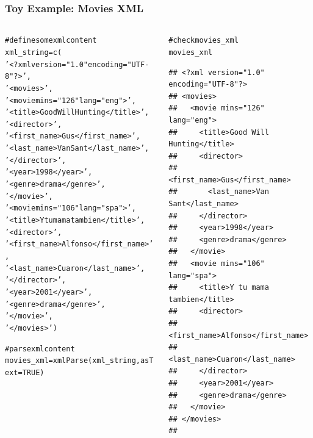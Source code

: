 \documentclass{beamer}\usepackage[]{graphicx}\usepackage[]{color}
\makeatletter
\newcommand{\hlnum}[1]{\textcolor[rgb]{0.063,0.58,0.627}{#1}}%
\newcommand{\hlstr}[1]{\textcolor[rgb]{0.063,0.58,0.627}{#1}}%
\newcommand{\hlcom}[1]{\textcolor[rgb]{0.588,0.588,0.588}{#1}}%
\newcommand{\hlstd}[1]{\textcolor[rgb]{0.196,0.196,0.196}{#1}}%
\newcommand{\hlkwb}[1]{\textcolor[rgb]{0.627,0,0.314}{#1}}%
\newcommand{\hlkwc}[1]{\textcolor[rgb]{0,0.631,0.314}{#1}}%
\newcommand{\hlkwd}[1]{\textcolor[rgb]{0.78,0.227,0.412}{#1}}%
\newenvironment{kframe}{%
 \def\at@end@of@kframe{}%
 \ifinner\ifhmode%
  \def\at@end@of@kframe{\end{minipage}}%
  \begin{minipage}{\columnwidth}%
 \fi\fi%
 \def\FrameCommand##1{\hskip\@totalleftmargin \hskip-\fboxsep
 \colorbox{shadecolor}{##1}\hskip-\fboxsep
     \hskip-\linewidth \hskip-\@totalleftmargin \hskip\columnwidth}%
 \MakeFramed {\advance\hsize-\width
   \@totalleftmargin\z@ \linewidth\hsize
   \@setminipage}}%
 {\par\unskip\endMakeFramed%
 \at@end@of@kframe}
\newenvironment{knitrout}{}{} %
\makeatother
\begin{document}
\begin{frame}[fragile]
\frametitle{Toy Example: Movies XML}

\begin{columns}[t]
\begin{column}{0.5\textwidth}
\begin{knitrout}\tiny
{}\color{fgcolor}\begin{kframe}
\begin{alltt}
\hlcom{# define some xml content}
\hlstd{xml_string} \hlkwb{=} \hlkwd{c}\hlstd{(}
  \hlstr{'<?xml version="1.0" encoding="UTF-8"?>'}\hlstd{,}
  \hlstr{'<movies>'}\hlstd{,}
  \hlstr{'<movie mins="126" lang="eng">'}\hlstd{,}
  \hlstr{'<title>Good Will Hunting</title>'}\hlstd{,}
  \hlstr{'<director>'}\hlstd{,}
  \hlstr{'<first_name>Gus</first_name>'}\hlstd{,}
  \hlstr{'<last_name>Van Sant</last_name>'}\hlstd{,}
  \hlstr{'</director>'}\hlstd{,}
  \hlstr{'<year>1998</year>'}\hlstd{,}
  \hlstr{'<genre>drama</genre>'}\hlstd{,}
  \hlstr{'</movie>'}\hlstd{,}
  \hlstr{'<movie mins="106" lang="spa">'}\hlstd{,}
  \hlstr{'<title>Y tu mama tambien</title>'}\hlstd{,}
  \hlstr{'<director>'}\hlstd{,}
  \hlstr{'<first_name>Alfonso</first_name>'}\hlstd{,}
  \hlstr{'<last_name>Cuaron</last_name>'}\hlstd{,}
  \hlstr{'</director>'}\hlstd{,}
  \hlstr{'<year>2001</year>'}\hlstd{,}
  \hlstr{'<genre>drama</genre>'}\hlstd{,}
  \hlstr{'</movie>'}\hlstd{,}
  \hlstr{'</movies>'}\hlstd{)}

\hlcom{# parse xml content}
\hlstd{movies_xml} \hlkwb{=} \hlkwd{xmlParse}\hlstd{(xml_string,} \hlkwc{asText} \hlstd{=} \hlnum{TRUE}\hlstd{)}
\end{alltt}
\end{kframe}
\end{knitrout}
\end{column}

\begin{column}{0.5\textwidth}
\begin{knitrout}\tiny
{}\color{fgcolor}\begin{kframe}
\begin{alltt}
\hlcom{# check movies_xml}
\hlstd{movies_xml}
\end{alltt}
\begin{verbatim}
## <?xml version="1.0" encoding="UTF-8"?>
## <movies>
##   <movie mins="126" lang="eng">
##     <title>Good Will Hunting</title>
##     <director>
##       <first_name>Gus</first_name>
##       <last_name>Van Sant</last_name>
##     </director>
##     <year>1998</year>
##     <genre>drama</genre>
##   </movie>
##   <movie mins="106" lang="spa">
##     <title>Y tu mama tambien</title>
##     <director>
##       <first_name>Alfonso</first_name>
##       <last_name>Cuaron</last_name>
##     </director>
##     <year>2001</year>
##     <genre>drama</genre>
##   </movie>
## </movies>
## 
\end{verbatim}
\end{kframe}
\end{knitrout}
\end{column}
\end{columns}

\end{frame}
\end{document}
